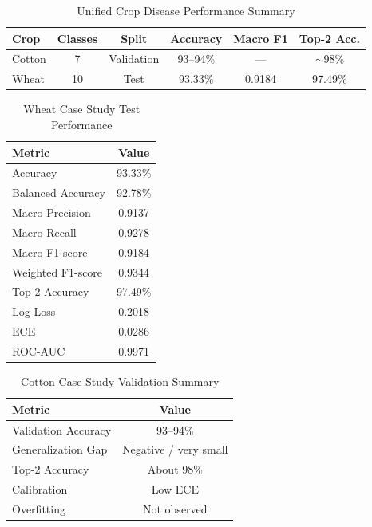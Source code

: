 \documentclass[12pt,a4paper]{report}
\begin{document}
\begin{table}[t]
\centering
\caption{Unified Crop Disease Performance Summary}
\label{tab:unified-performance}
\begin{tabular}{lccccc}
\hline
Crop & Classes & Split & Accuracy & Macro F1 & Top-2 Acc. \\
\hline
Cotton & 7 & Validation & 93--94\% & --- & $\sim$98\% \\
Wheat & 10 & Test & 93.33\% & 0.9184 & 97.49\% \\
\hline
\end{tabular}
\end{table}

\begin{table}[t]
\centering
\caption{Wheat Case Study Test Performance}
\label{tab:wheat-performance}
\begin{tabular}{lc}
\hline
Metric & Value \\
\hline
Accuracy & 93.33\% \\
Balanced Accuracy & 92.78\% \\
Macro Precision & 0.9137 \\
Macro Recall & 0.9278 \\
Macro F1-score & 0.9184 \\
Weighted F1-score & 0.9344 \\
Top-2 Accuracy & 97.49\% \\
Log Loss & 0.2018 \\
ECE & 0.0286 \\
ROC-AUC & 0.9971 \\
\hline
\end{tabular}
\end{table}

\begin{table}[t]
\centering
\caption{Cotton Case Study Validation Summary}
\label{tab:cotton-performance}
\begin{tabular}{lc}
\hline
Metric & Value \\
\hline
Validation Accuracy & 93--94\% \\
Generalization Gap & Negative / very small \\
Top-2 Accuracy & About 98\% \\
Calibration & Low ECE \\
Overfitting & Not observed \\
\hline
\end{tabular}
\end{table}
\end{document}
